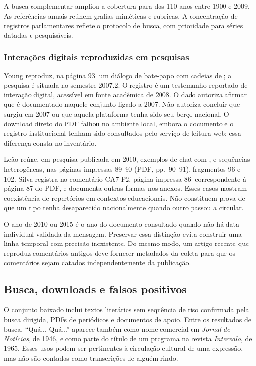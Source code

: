 A busca complementar ampliou a cobertura para \AnnualCovered{} dos 110 anos entre 1900 e 2009. As referências anuais reúnem grafias miméticas e rubricas. A concentração de registros parlamentares reflete o protocolo de busca, com prioridade para séries datadas e pesquisáveis.

\subsubsection{Interações digitais reproduzidas em pesquisas}
Young \cite{young2008} reproduz, na página 93, um diálogo de bate-papo com cadeias de ; a pesquisa é situada no semestre 2007.2. O registro é um testemunho reportado de interação digital, acessível em fonte acadêmica de 2008. O dado autoriza afirmar que  é documentado naquele conjunto ligado a 2007. Não autoriza concluir que surgiu em 2007 ou que aquela plataforma tenha sido seu berço nacional. O download direto do PDF falhou no ambiente local, embora o documento e o registro institucional tenham sido consultados pelo serviço de leitura web; essa diferença consta no inventário.

Leão \cite{leao2010} reúne, em pesquisa publicada em 2010, exemplos de chat com ,  e sequências heterogêneas, nas páginas impressas 89--90 (PDF, pp.~90--91), fragmentos 96 e 102. Silva \cite{silva2015} registra  no comentário CA7 P2, página impressa 86, correspondente à página 87 do PDF, e documenta outras formas nos anexos. Esses casos mostram coexistência de repertórios em contextos educacionais. Não constituem prova de que um tipo tenha desaparecido nacionalmente quando outro passou a circular.

O ano de 2010 ou 2015 é o ano do documento consultado quando não há data individual validada da mensagem. Preservar essa distinção evita construir uma linha temporal com precisão inexistente. Do mesmo modo, um artigo recente que reproduz comentários antigos deve fornecer metadados da coleta para que os comentários sejam datados independentemente da publicação.

\subsection{Busca, downloads e falsos positivos}
O conjunto baixado inclui textos literários sem sequência de riso confirmada pela busca dirigida, PDFs de periódicos e documentos de apoio. Entre os resultados de busca, ``Quá... Quá...'' aparece também como nome comercial em \textit{Jornal de Notícias}, de 1946, e como parte do título de um programa na revista \textit{Intervalo}, de 1965. Esses usos podem ser pertinentes à circulação cultural de uma expressão, mas não são contados como transcrições de alguém rindo.


